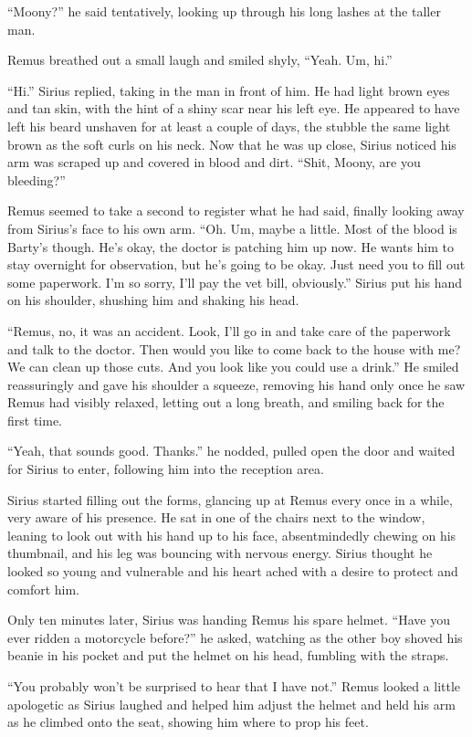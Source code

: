 \documentclass[12pt,twoside,openright]{memoir}
\begin{document}
``Moony?'' he said tentatively, looking up through his long lashes at the taller man.

Remus breathed out a small laugh and smiled shyly, ``Yeah. Um, hi.''

``Hi.'' Sirius replied, taking in the man in front of him. He had light brown eyes and tan skin, with the hint of a shiny scar near his left eye. He appeared to have left his beard unshaven for at least a couple of days, the stubble the same light brown as the soft curls on his neck. Now that he was up close, Sirius noticed his arm was scraped up and covered in blood and dirt. ``Shit, Moony, are you bleeding?''

Remus seemed to take a second to register what he had said, finally looking away from Sirius's face to his own arm. ``Oh. Um, maybe a little. Most of the blood is Barty's though. He's okay, the doctor is patching him up now. He wants him to stay overnight for observation, but he's going to be okay. Just need you to fill out some paperwork. I'm so sorry, I'll pay the vet bill, obviously.'' Sirius put his hand on his shoulder, shushing him and shaking his head.

``Remus, no, it was an accident. Look, I'll go in and take care of the paperwork and talk to the doctor. Then would you like to come back to the house with me? We can clean up those cuts. And you look like you could use a drink.'' He smiled reassuringly and gave his shoulder a squeeze, removing his hand only once he saw Remus had visibly relaxed, letting out a long breath, and smiling back for the first time.

``Yeah, that sounds good. Thanks.'' he nodded, pulled open the door and waited for Sirius to enter, following him into the reception area.

Sirius started filling out the forms, glancing up at Remus every once in a while, very aware of his presence. He sat in one of the chairs next to the window, leaning to look out with his hand up to his face, absentmindedly chewing on his thumbnail, and his leg was bouncing with nervous energy. Sirius thought he looked so young and vulnerable and his heart ached with a desire to protect and comfort him.

Only ten minutes later, Sirius was handing Remus his spare helmet. ``Have you ever ridden a motorcycle before?'' he asked, watching as the other boy shoved his beanie in his pocket and put the helmet on his head, fumbling with the straps.

``You probably won't be surprised to hear that I have not.'' Remus looked a little apologetic as Sirius laughed and helped him adjust the helmet and held his arm as he climbed onto the seat, showing him where to prop his feet.
\end{document}
